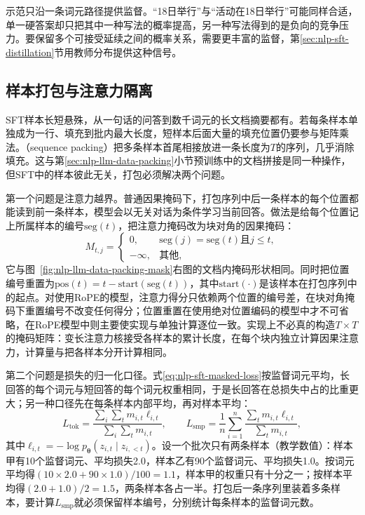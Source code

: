 示范只沿一条词元路径提供监督。“18日举行”与“活动在18日举行”可能同样合适，单一硬答案却只把其中一种写法的概率提高，另一种写法得到的是负向的竞争压力。要保留多个可接受延续之间的概率关系，需要更丰富的监督，第\ref{sec:nlp-sft-distillation}节用教师分布提供这种信号。

\subsection{样本打包与注意力隔离}
\label{sec:nlp-sft-packing}

SFT样本长短悬殊，从一句话的问答到数千词元的长文档摘要都有。若每条样本单独成为一行、填充到批内最大长度，短样本后面大量的填充位置仍要参与矩阵乘法。（sequence packing）把多条样本首尾相接放进一条长度为$T$的序列，几乎消除填充。这与第\ref{sec:nlp-llm-data-packing}小节预训练中的文档拼接是同一种操作，但SFT中的样本彼此无关，打包必须解决两个问题。

第一个问题是注意力越界。普通因果掩码下，打包序列中后一条样本的每个位置都能读到前一条样本，模型会以无关对话为条件学习当前回答。做法是给每个位置记上所属样本的编号$\mathrm{seg}(t)$，把注意力掩码改为块对角的因果掩码：
\begin{equation}
 M_{t,j}=
 \begin{cases}
  0, & \mathrm{seg}(j)=\mathrm{seg}(t)\text{且}j\leq t,\\
  -\infty, & \text{其他},
 \end{cases}
 \label{eq:nlp-sft-block-mask}
\end{equation}
它与图~\ref{fig:nlp-llm-data-packing-mask}右图的文档内掩码形状相同。同时把位置编号重置为$\mathrm{pos}(t)=t-\mathrm{start}(\mathrm{seg}(t))$，其中$\mathrm{start}(\cdot)$是该样本在打包序列中的起点。对使用RoPE的模型，注意力得分只依赖两个位置的编号差，在块对角掩码下重置编号不改变任何得分；位置重置在使用绝对位置编码的模型中才不可省略，在RoPE模型中则主要使实现与单独计算逐位一致。实现上不必真的构造$T\times T$的掩码矩阵：变长注意力核接受各样本的累计长度，在每个块内独立计算因果注意力，计算量与把各样本分开计算相同。

第二个问题是损失的归一化口径。式\eqref{eq:nlp-sft-masked-loss}按监督词元平均，长回答的每个词元与短回答的每个词元权重相同，于是长回答在总损失中占的比重更大；另一种口径先在每条样本内部平均，再对样本平均：
\begin{equation}
 L_{\mathrm{tok}}=\frac{\sum_i\sum_t m_{i,t}\ell_{i,t}}{\sum_i\sum_t m_{i,t}},
 \qquad
 L_{\mathrm{smp}}=\frac1n\sum_{i=1}^{n}\frac{\sum_t m_{i,t}\ell_{i,t}}{\sum_t m_{i,t}},
 \label{eq:nlp-sft-loss-normalization}
\end{equation}
其中$\ell_{i,t}=-\log p_{\bm\theta}(z_{i,t}\mid z_{i,<t})$。设一个批次只有两条样本（教学数值）：样本甲有10个监督词元、平均损失2.0，样本乙有90个监督词元、平均损失1.0。按词元平均得$(10\times2.0+90\times1.0)/100=1.1$，样本甲的权重只有十分之一；按样本平均得$(2.0+1.0)/2=1.5$，两条样本各占一半。打包后一条序列里装着多条样本，要计算$L_{\mathrm{smp}}$就必须保留样本编号，分别统计每条样本的监督词元数。

